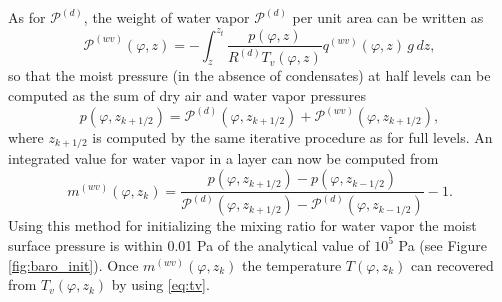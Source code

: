 \documentclass{agujournal}
\begin{document}
As for $\mathcal{P}^{(d)}$, the weight of water vapor $\mathcal{P}^{(d)}$ per unit area can be written as
\begin{equation}
{\mathcal{P}}^{(wv)}(\varphi,z)=-\int_z^{z_t}\frac{p(\varphi,z)}{R^{(d)} T_v(\varphi,z)}q^{(wv)}(\varphi,z)\, g\, dz,\label{eq:Upvw}
\end{equation}
so that the moist pressure (in the absence of condensates) at half levels can be computed as the sum of dry air and water vapor pressures
\begin{equation}
p(\varphi,z_{k+1/2})={\mathcal{P}}^{(d)}(\varphi,z_{k+1/2})+{\mathcal{P}}^{(wv)}(\varphi,z_{k+1/2}),
\end{equation}
where $z_{k+1/2}$ is computed by the same iterative procedure as for full levels. An integrated value for water vapor in a layer can now be computed from
\begin{equation}
m^{(wv)}(\varphi,z_k)=\frac{p(\varphi,z_{k+1/2})-p(\varphi,z_{k-1/2})}{{\mathcal{P}}^{(d)}(\varphi,z_{k+1/2})-{\mathcal{P}}^{(d)}(\varphi,z_{k-1/2})}-1.
\end{equation}
Using this method for initializing the mixing ratio for water vapor the moist surface pressure is within 0.01 Pa of the analytical value of $10^5$ Pa (see Figure \ref{fig:baro_init}). Once $m^{(wv)}(\varphi,z_k)$ the temperature $T(\varphi,z_k)$ can recovered from $T_v(\varphi,z_k)$ by using \eqref{eq:tv}.
\end{document}
